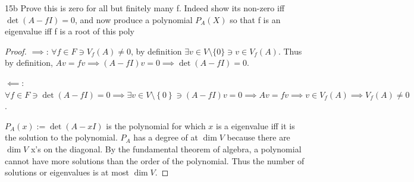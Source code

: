 \documentclass{article}
\begin{document}
\begin{PROB}{15b}\label{Problem 15b.}
    Prove this is zero for all but finitely many f. Indeed show its non-zero iff $\det(A-fI)=0$, and now produce a polynomial $P_A(X)$ so that f is an eigenvalue iff f is a root of this poly
\end{PROB}
\begin{proof}
    $\implies$: $\forall f \in F \ni V_f(A) \neq 0$, by definition $\exists v \in V \setminus \{0\} \ni v \in V_f(A)$. Thus by definition, $Av = fv \implies (A - fI)v = 0 \implies \det(A - fI) = 0$.

    $\impliedby$: $\forall f \in F \ni \det(A - fI) = 0 \implies \exists v \in V \setminus \left\{0\right\} \ni (A - fI)v = 0 \implies Av = fv \implies v \in V_f(A) \implies V_f\left(A\right) \neq 0$. 



    $P_A(x) := \det(A - xI)$ is the polynomial for which $x$ is a eigenvalue iff it is the solution to the polynomial. $P_A$ has a degree of at $\dim V$ because there are $\dim V$ x's on the diagonal. By the fundamental theorem of algebra, a polynomial cannot have more solutions than the order of the polynomial. Thus
    the number of solutions or eigenvalues is at most $\dim V$.
    
\end{proof}

\bigskip
\end{document}
